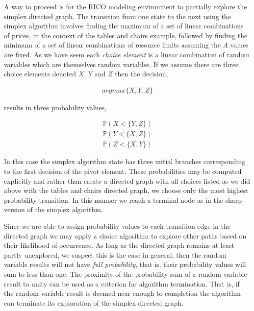 A way to proceed is for the RICO modeling environment to partially explore
the simplex directed graph. The transition from one state to the next
using the simplex algorithm involves finding the maximum of a set of
linear combinations of prices, in the context of the tables and chairs
example, followed by finding the minimum of a set of linear
combinations of resource limits assuming the $A$ values are fixed. As
we have seem each \emph{choice element} is a linear combination of random
variables which are themselves random variables. If we assume there
are three choice elements denoted $X$, $Y$ and $Z$ then the decision,

\begin{align*}
argmax\{X, Y, Z\}
\end{align*}

results in three probability values,

\begin{align*}
\mathbb{P}(X < \{Y, Z\})\\
\mathbb{P}(Y < \{X,Z\})\\
\mathbb{P}(Z < \{X,Y\})
\end{align*}

In this case the simplex algorithm state has three initial branches
corresponding to the first decision of the pivot element. These
probabilities may be computed explicitly and rather than create a
directed graph with all choices listed as we did above with the tables
and chairs directed graph, we choose only the most highest probability
transition. In this manner we reach a terminal node as in the sharp
version of the simplex algorithm. 

Since we are able to assign probability values to each transition edge
in the directed graph we may apply a choice algorithm to explore other
paths based on their likelihood of occurrence. As long as the directed
graph remains at least partly unexplored, we suspect this is the case
in general, then the random variable results will not have \emph{full
  probability}, that is, their probability values will sum to less
than one. The proximity of the probability sum of a random variable
result to unity can be used as a criterion for algorithm
termination. That is, if the random variable result is deemed near
enough to completion the algorithm can terminate its exploration
of the simplex directed graph.
 
